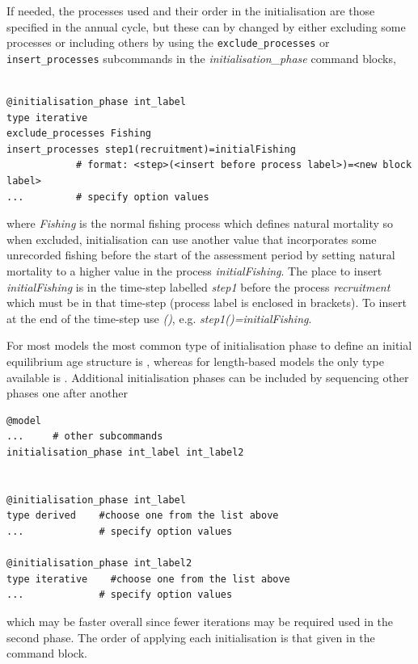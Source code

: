 If needed, the processes used and their order in the initialisation are those specified in the annual cycle, but these can by changed by either excluding some processes or including others by using the  \texttt{exclude\_processes} or  \texttt{insert\_processes} subcommands in the \textit{initialisation\_phase} command blocks,

{\small{\begin{verbatim}

@initialisation_phase int_label
type iterative
exclude_processes Fishing
insert_processes step1(recruitment)=initialFishing
            # format: <step>(<insert before process label>)=<new block label>
...         # specify option values

\end{verbatim}}}

where \textit{Fishing} is the normal fishing process which defines natural mortality so when excluded, initialisation can use another value that incorporates some unrecorded fishing before the start of the assessment period by setting natural mortality to a higher value in the process \textit{initialFishing}. The place to insert \textit{initialFishing} is in the time-step labelled \textit{step1} before the process \textit{recruitment} which must be in that time-step (process label is enclosed in brackets). To insert at the end of the time-step use \textit{()}, e.g. \textit{step1()=initialFishing}.

For most models the most common type of initialisation phase to define an initial equilibrium age structure is , whereas for length-based models the only type available is . Additional initialisation phases can be included by sequencing other phases one after another

{\small{\begin{verbatim}
@model
...     # other subcommands
initialisation_phase int_label int_label2


@initialisation_phase int_label
type derived    #choose one from the list above
...             # specify option values

@initialisation_phase int_label2
type iterative    #choose one from the list above
...             # specify option values

\end{verbatim}}}

which may be faster overall since fewer iterations may be required used in the second phase. The order of applying each initialisation is that given in the  command block.

